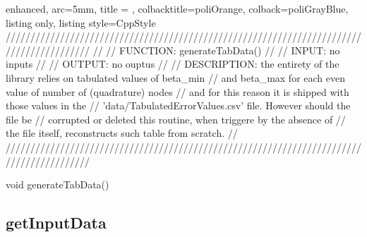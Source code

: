 \documentclass[a4paper, twosided]{book}
\begin{document}
\begin{tcblisting}{enhanced,
                   arc=5mm,
                   title = \color{black}{\large \ttfamily DatIo.cpp/generateTabData},
                   colbacktitle=poliOrange,
                   colback=poliGrayBlue,
                   listing only,
                   listing style=CppStyle}
/////////////////////////////////////////////////////////////////////////////////////////
//
//       FUNCTION: generateTabData()
//                
//          INPUT: no inputs
//
//       OUTPUT: no ouptus
//
//    DESCRIPTION: the entirety of the library relies on tabulated values of beta_min 
//                 and beta_max for each even value of number of (quadrature) nodes 
//                 and for this reason it is shipped with those values in  the
//                 'data/TabulatedErrorValues.csv' file. However should the file be 
//                 corrupted or deleted this routine, when triggere by the absence of 
//                 the file itself, reconstructs such table from scratch.
//
/////////////////////////////////////////////////////////////////////////////////////////

void generateTabData()
\end{tcblisting}

\subsection[getInputData]{\changefont getInputData}\label{SubSec4.2.2}
\end{document}
